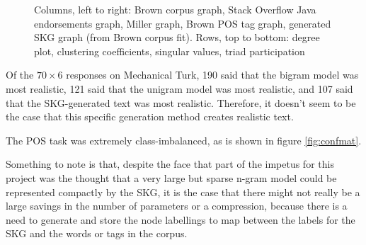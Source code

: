 \documentclass[12pt]{article}
\begin{document}
\begin{figure}
  \caption{Columns, left to right: Brown corpus graph, Stack Overflow Java endorsements graph, Miller graph, Brown POS tag graph, generated SKG graph (from Brown corpus fit). Rows, top to bottom: degree plot, clustering coefficients, singular values, triad participation}
\end{figure}

Of the $70 \times 6$ responses on Mechanical Turk, 190 said that the bigram model was most realistic, 121 said that the unigram model was most realistic, and 107 said that the SKG-generated text was most realistic. Therefore, it doesn't seem to be the case that this specific generation method creates realistic text.

The POS task was extremely class-imbalanced, as is shown in figure \ref{fig:confmat}.


Something to note is that, despite the face that part of the impetus for this project was the thought that a very large but sparse n-gram model could be represented compactly by the SKG, it is the case that there might not really be a large savings in the number of parameters or a compression, because there is a need to generate and store the node labellings to map between the labels for the SKG and the words or tags in the corpus.

\end{document}

